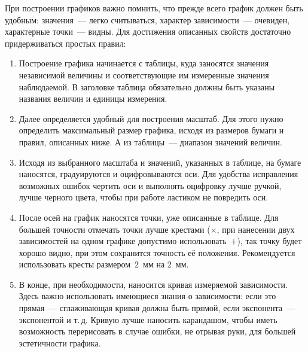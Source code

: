 При построении графиков важно помнить, что прежде всего график должен быть удобным: значения~--- легко считываться, характер зависимости~--- очевиден, характерные точки~--- видны. Для достижения описанных свойств достаточно придерживаться простых правил:
\begin{enumerate}
    \item Построение графика начинается с таблицы, куда заносятся значения независимой величины и соответствующие им измеренные значения наблюдаемой. В заголовке таблица обязательно должны быть указаны названия величин и единицы измерения. 
    \item Далее определяется удобный для построения масштаб. Для этого нужно определить максимальный размер графика, исходя из размеров бумаги и правил, описанных ниже. А из таблицы~--- диапазон значений величин.
    \item Исходя из выбранного масштаба и значений, указанных в таблице, на бумаге наносятся, градуируются и оцифровываются оси. Для удобства исправления возможных ошибок чертить оси и выполнять оцифровку лучше ручкой, лучше черного цвета, чтобы при работе ластиком не повредить оси.
    \item После осей на график наносятся точки, уже описанные в таблице. Для большей точности отмечать точки лучше крестами ($\times$, при нанесении двух зависимостей на одном графике допустимо использовать~$+$), так точку будет хорошо видно, при этом сохранится точность её положения. Рекомендуется использовать кресты размером~2~мм на 2~мм.
    \item В конце, при необходимости, наносится кривая измеряемой зависимости. Здесь важно использовать имеющиеся знания о зависимости: если это прямая~--- сглаживающая кривая должна быть прямой, если экспонента~--- экспонентой и т.\,д. Кривую лучше наносить карандашом, чтобы иметь возможность перерисовать в случае ошибки, не отрывая руки, для большей эстетичности графика.
\end{enumerate}


